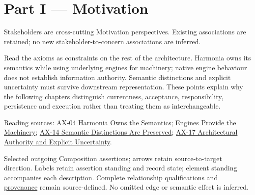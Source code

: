 \part*{Part I — Motivation}
\label{navigation:I}
Stakeholders are cross-cutting Motivation perspectives. Existing associations are retained; no new stakeholder-to-concern associations are inferred.\par
Read the axioms as constraints on the rest of the architecture. Harmonia owns its semantics while using underlying engines for machinery; native engine behaviour does not establish information authority. Semantic distinctions and explicit uncertainty must survive downstream representation. These points explain why the following chapters distinguish currentness, acceptance, responsibility, persistence and execution rather than treating them as interchangeable.

{\small Reading sources: \hyperref[element:54508cda80484a6caf95b901780eaf7d]{AX-04 Harmonia Owns the Semantics; Engines Provide the Machinery}; \hyperref[element:d3fc6025dc7646d1b2020b51f7a44bfa]{AX-14 Semantic Distinctions Are Preserved}; \hyperref[element:8882573df7ce43c6bc0f66da0a676139]{AX-17 Architectural Authority and Explicit Uncertainty}.}\par
\begin{center}\end{center}
{\small Selected outgoing Composition assertions; arrows retain source-to-target direction. Labels retain assertion standing and record state; element standing accompanies each description. \href{structure.json}{Complete relationship qualifications and provenance} remain source-defined. No omitted edge or semantic effect is inferred.}\par
